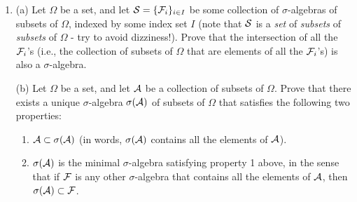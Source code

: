 \begin{enumerate}[label=\arabic*.]
\begin{equation*}
\tag{27}\label{eq:binomial}
\mathrm{P}(A_{N,k}) = \binom{N}{k} p^k (1-p)^{N-k},
\end{equation*}

\noindent is true. You may submit a short written explanation
to test your understanding, but it is not required.

(b) A group of $N$ prisoners is locked up in a
prison, each in a separate cell with no ability to
communicate with the other prisoners. Each cell
contains a mysterious on/off electrical switch. One
evening the warden visits each of the prisoners and
presents them with the following dilemma: During the
night each prisoner must choose whether to leave his
switch in the on or off position. If at midnight
\emph{exactly one} of the switches is in the on position,
all the prisoners will be set free in the morning;
otherwise they will all be executed!

The prisoners cannot coordinate their actions, but
they are all rational, know calculus and probability
theory, and each is equipped with a random number
generator. Find the strategy that the prisoners will
take to maximize their chance of survival, and compute
what that chance is, as a function of $N$ and in the
limit when $N$ is very large. For extra fun, try to
guess in advance how big or small you expect the
survival likelihood to be, and see how your guess
measures up to the actual result.

\item (a) Let $\Omega$ be a set, and let
${\cal S} = \{{\cal F}_i\}_{i\in I}$ be some
collection of $\sigma$-algebras of subsets of
$\Omega$, indexed by some index set $I$ (note that
${\cal S}$ is a \emph{set} of \emph{subsets} of \emph{subsets} of
$\Omega$ - try to avoid dizziness!). Prove that the
intersection of all the ${\cal F}_i$'s (i.e., the
collection of subsets of $\Omega$ that are elements
of all the ${\cal F}_i$'s) is also a $\sigma$-algebra.

(b) Let $\Omega$ be a set, and let ${\cal A}$ be a
collection of subsets of $\Omega$. Prove that there
exists a unique $\sigma$-algebra $\sigma({\cal A})$
of subsets of $\Omega$ that satisfies the following
two properties:

\begin{enumerate}[label=(\roman*)]
\item ${\cal A} \subset \sigma({\cal A})$ (in words,
$\sigma({\cal A})$ contains all the elements of
${\cal A}$).

\item $\sigma({\cal A})$ is the minimal $\sigma$-algebra
satisfying property 1 above, in the sense that if
${\cal F}$ is any other $\sigma$-algebra that
contains all the elements of ${\cal A}$, then
$\sigma({\cal A}) \subset {\cal F}$.
\end{enumerate}


\end{enumerate}
